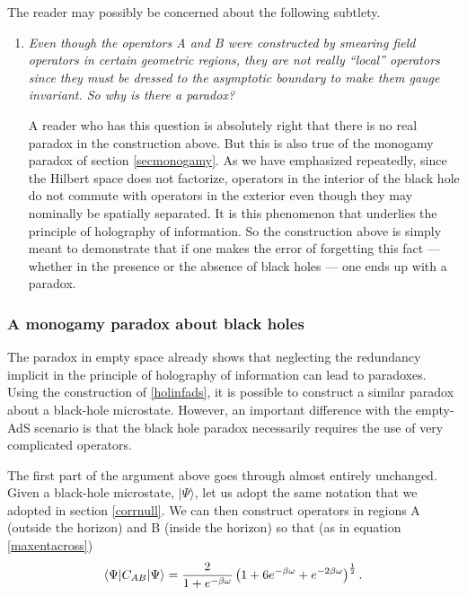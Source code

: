 \documentclass[12pt]{article}
\newcommand{\be}{\begin{equation}}
\newcommand{\ee}{\end{equation}}
\begin{document}
The reader may possibly be concerned about the following subtlety.
\begin{enumerate}[qseries]
\item
{\em 
Even though the operators A and B were constructed by smearing field operators in certain geometric regions, they are not really ``local'' operators since they must be dressed to the asymptotic boundary to make them gauge invariant.  So why is there a paradox?}

A reader who has this question is absolutely right that there is no real paradox in the construction above. But this is also true of the monogamy paradox of section \ref{secmonogamy}. As we have emphasized repeatedly, since the Hilbert space does not factorize, operators in the interior of the black hole do not commute with operators in the exterior even though they may nominally be spatially separated. It is this phenomenon that underlies the principle of holography of information. So the construction above is simply meant to demonstrate that if one makes the error of forgetting this fact --- whether in the presence or the absence of black holes ---  one ends up with a paradox.
\end{enumerate}












\subsubsection{A monogamy paradox about black holes}
The paradox in empty space already shows that  neglecting the redundancy  implicit in the principle of holography
of information can lead to paradoxes. Using the construction of \ref{holinfads}, it is possible to construct a similar paradox about a black-hole microstate. However, an important difference with the empty-AdS scenario is that the black hole paradox necessarily requires the use of very complicated operators.  

The first part of the argument above goes through almost entirely unchanged. Given a black-hole microstate, $|\Psi \rangle$, let us adopt the same notation that we adopted in section \ref{corrnull}. We can then
construct operators in regions A (outside the horizon) and B (inside the horizon) so that (as in equation \eqref{maxentacross})
\be
\langle \Psi | C_{AB} |\Psi \rangle =  {2 \over 1 + e^{-\beta \omega}} \left(1 + 6 e^{-{\beta \omega}} + e^{-2{\beta \omega}} \right)^{1 \over 2}.
\ee
\end{document}

